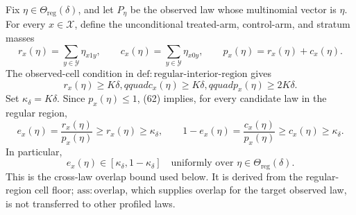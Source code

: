 Fix \(\eta\in\Theta_{\mathrm{reg}}(\delta)\), and let \(P_\eta\) be the observed law whose multinomial vector is \(\eta\).  For every \(x\in\mathcal X\), define the unconditional treated-arm, control-arm, and stratum masses
\[
r_x(\eta)=\sum_{y\in\mathcal Y}\eta_{x1y},\qquad
c_x(\eta)=\sum_{y\in\mathcal Y}\eta_{x0y},\qquad
p_x(\eta)=r_x(\eta)+c_x(\eta).
\tag{61}
\]
The observed-cell condition in \(\mathrm{def{:}regular\mbox{-}interior\mbox{-}region}\) gives
\[
r_x(\eta)\geq K\delta,qquad
c_x(\eta)\geq K\delta,qquad
p_x(\eta)\geq2K\delta.
\tag{62}
\]
Set \(\kappa_\delta=K\delta\).  Since \(p_x(\eta)\leq1\), (62) implies, for every candidate law in the regular region,
\[
e_x(\eta)=\frac{r_x(\eta)}{p_x(\eta)}
\geq r_x(\eta)\geq\kappa_\delta,
\qquad
1-e_x(\eta)=\frac{c_x(\eta)}{p_x(\eta)}
\geq c_x(\eta)\geq\kappa_\delta.
\tag{63}
\]
In particular,
\[
e_x(\eta)\in[\kappa_\delta,1-\kappa_\delta]
\quad\text{uniformly over }\eta\in\Theta_{\mathrm{reg}}(\delta).
\tag{64}
\]
This is the cross-law overlap bound used below.  It is derived from the regular-region cell floor; \(\mathrm{ass{:}overlap}\), which supplies overlap for the target observed law, is not transferred to other profiled laws.

